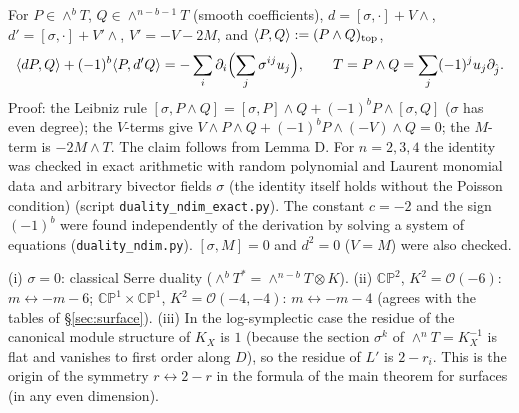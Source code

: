 \begin{lem}\tP \tV\label{lem:E}
For $P\in\wedge^bT$, $Q\in\wedge^{n-b-1}T$ (smooth coefficients), $d=[\sigma,\cdot]+V\wedge$, $d'=[\sigma,\cdot]+V'\wedge$, $V'=-V-2M$, and $\langle P,Q\rangle:=(P\wedge Q)_{\rm top}$,
\[\langle dP,Q\rangle+(-1)^b\langle P,d'Q\rangle=-\sum_i\partial_i\Bigl(\sum_j\sigma^{ij}u_j\Bigr),\qquad T=P\wedge Q=\sum_j(-1)^ju_j\partial_{\hat j}.\]
Proof: the Leibniz rule $[\sigma,P\wedge Q]=[\sigma,P]\wedge Q+(-1)^bP\wedge[\sigma,Q]$ ($\sigma$ has even degree); the $V$-terms give $V\wedge P\wedge Q+(-1)^bP\wedge(-V)\wedge Q=0$; the $M$-term is $-2M\wedge T$. The claim follows from Lemma D.
\tV For $n=2,3,4$ the identity was checked in exact arithmetic with random polynomial and Laurent monomial data and arbitrary bivector fields $\sigma$ (the identity itself holds without the Poisson condition) (script \texttt{duality\_ndim\_exact.py}). The constant $c=-2$ and the sign $(-1)^b$ were found independently of the derivation by solving a system of equations (\texttt{duality\_ndim.py}). $[\sigma,M]=0$ and $d^2=0$ ($V=M$) were also checked.
\end{lem}
\begin{rem}
(i) $\sigma=0$: classical Serre duality ($\wedge^bT^*=\wedge^{n-b}T\otimes K$). (ii) $\mathbb{CP}^2$, $K^2=\mathcal O(-6)$: $m\leftrightarrow-m-6$; $\mathbb{CP}^1\times\mathbb{CP}^1$, $K^2=\mathcal O(-4,-4)$: $m\leftrightarrow-m-4$ (agrees with the tables of \S\ref{sec:surface}). (iii) In the log-symplectic case the residue of the canonical module structure of $K_X$ is $1$ (because the section $\sigma^k$ of $\wedge^nT=K_X^{-1}$ is flat and vanishes to first order along $D$), so the residue of $L'$ is $2-r_i$. This is the origin of the symmetry $r\leftrightarrow2-r$ in the formula of the main theorem for surfaces (in any even dimension).
\end{rem}
